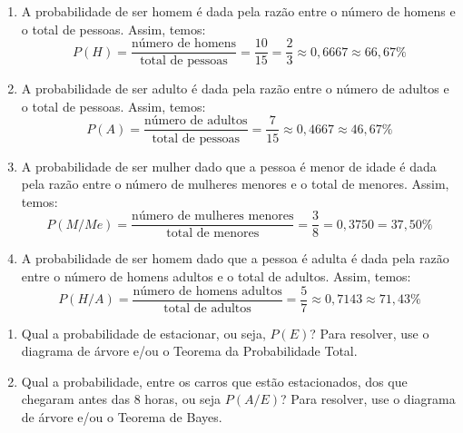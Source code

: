 \documentclass{jhwhw}
\begin{document}
\begin{enumerate}[label=\alph*)]
	\item A probabilidade de ser homem é dada pela razão entre o número de homens e o total de pessoas. Assim, temos:
	      \begin{equation*}
		      P(H) = \frac{\text{número de homens}}{\text{total de pessoas}} = \frac{10}{15} = \frac{2}{3} \approx 0,6667 \approx \boxed{66,67\%}
	      \end{equation*}
	\item A probabilidade de ser adulto é dada pela razão entre o número de adultos e o total de pessoas. Assim, temos:
	      \begin{equation*}
		      P(A) = \frac{\text{número de adultos}}{\text{total de pessoas}} = \frac{7}{15} \approx 0,4667 \approx \boxed{46,67\%}
	      \end{equation*}
	\item A probabilidade de ser mulher dado que a pessoa é menor de idade é dada pela razão entre o número de mulheres menores e o total de menores. Assim, temos:
	      \begin{equation*}
		      P(M/Me) = \frac{\text{número de mulheres menores}}{\text{total de menores}} = \frac{3}{8} = 0,3750 = \boxed{37,50\%}
	      \end{equation*}
	\item A probabilidade de ser homem dado que a pessoa é adulta é dada pela razão entre o número de homens adultos e o total de adultos. Assim, temos:
	      \begin{equation*}
		      P(H/A) = \frac{\text{número de homens adultos}}{\text{total de adultos}} = \frac{5}{7} \approx 0,7143 \approx \boxed{71,43\%}
	      \end{equation*}
\end{enumerate}
\begin{enumerate}
	\item Qual a probabilidade de estacionar, ou seja, $P(E)$? Para resolver, use o diagrama de árvore e/ou o Teorema da Probabilidade Total.
	\item Qual a probabilidade, entre os carros que estão estacionados, dos que chegaram antes das 8 horas, ou seja $P(A/E)$? Para resolver, use o diagrama de árvore e/ou o Teorema de Bayes.
\end{enumerate}
\end{document}
